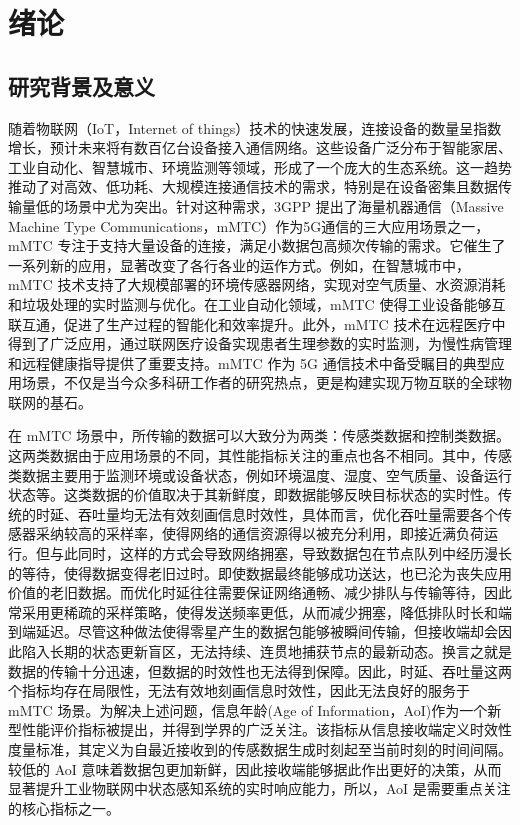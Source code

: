 \clearpage

\section{绪论}

\subsection{研究背景及意义}
随着物联网（IoT，Internet of things）技术的快速发展，连接设备的数量呈指数增长，预计未来将有数百亿台设备接入通信网络\cite{zhang2017iot}。这些设备广泛分布于智能家居、工业自动化、智慧城市、环境监测等领域，形成了一个庞大的生态系统\cite{elluri2026exploring}。这一趋势推动了对高效、低功耗、大规模连接通信技术的需求，特别是在设备密集且数据传输量低的场景中尤为突出\cite{2}。针对这种需求，3GPP 提出了海量机器通信（Massive Machine Type Communications，mMTC）作为5G通信的三大应用场景之一\cite{3}，mMTC 专注于支持大量设备的连接，满足小数据包高频次传输的需求\cite{4}。它催生了一系列新的应用，显著改变了各行各业的运作方式。例如，在智慧城市中，mMTC 技术支持了大规模部署的环境传感器网络，实现对空气质量、水资源消耗和垃圾处理的实时监测与优化\cite{5}。在工业自动化领域，mMTC 使得工业设备能够互联互通，促进了生产过程的智能化和效率提升\cite{6}。此外，mMTC 技术在远程医疗中得到了广泛应用，通过联网医疗设备实现患者生理参数的实时监测，为慢性病管理和远程健康指导提供了重要支持\cite{7}。mMTC 作为 5G 通信技术中备受瞩目的典型应用场景，不仅是当今众多科研工作者的研究热点，更是构建实现万物互联的全球物联网的基石\cite{8}。

在 mMTC 场景中，所传输的数据可以大致分为两类：传感类数据和控制类数据\cite{9}。这两类数据由于应用场景的不同，其性能指标关注的重点也各不相同。其中，传感类数据主要用于监测环境或设备状态，例如环境温度、湿度、空气质量、设备运行状态等\cite{daraseliya2025resource}。这类数据的价值取决于其新鲜度，即数据能够反映目标状态的实时性\cite{saha2021minimum}。传统的时延、吞吐量均无法有效刻画信息时效性\cite{kosta2017age}，具体而言，优化吞吐量需要各个传感器采纳较高的采样率，使得网络的通信资源得以被充分利用，即接近满负荷运行。但与此同时，这样的方式会导致网络拥塞，导致数据包在节点队列中经历漫长的等待，使得数据变得老旧过时。即使数据最终能够成功送达，也已沦为丧失应用价值的老旧数据\cite{chen2016age}。而优化时延往往需要保证网络通畅、减少排队与传输等待，因此常采用更稀疏的采样策略，使得发送频率更低，从而减少拥塞，降低排队时长和端到端延迟。尽管这种做法使得零星产生的数据包能够被瞬间传输，但接收端却会因此陷入长期的状态更新盲区，无法持续、连贯地捕获节点的最新动态。换言之就是数据的传输十分迅速，但数据的时效性也无法得到保障\cite{sun2017update}。因此，时延、吞吐量这两个指标均存在局限性，无法有效地刻画信息时效性，因此无法良好的服务于 mMTC 场景。为解决上述问题，信息年龄(Age of Information，AoI)作为一个新型性能评价指标被提出，并得到学界的广泛关注\cite{11}。该指标从信息接收端定义时效性度量标准，其定义为自最近接收到的传感数据生成时刻起至当前时刻的时间间隔。较低的 AoI 意味着数据包更加新鲜，因此接收端能够据此作出更好的决策，从而显著提升工业物联网中状态感知系统的实时响应能力\cite{khodakhah2024balancing}，所以，AoI 是需要重点关注的核心指标之一。

